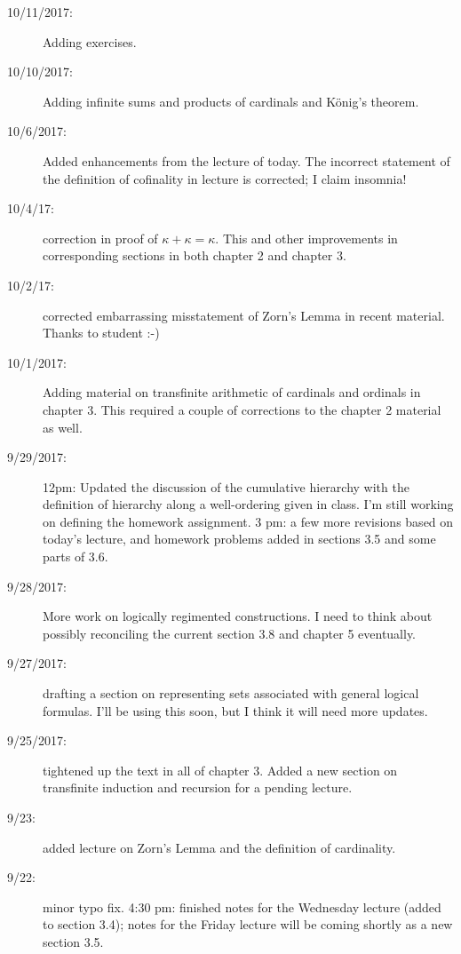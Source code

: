 \documentclass[12pt]{book}
\begin{document}
{\begin{description}
\item[10/11/2017:]  Adding exercises.

\item[10/10/2017:]  Adding infinite sums and products of cardinals and K\"onig's theorem.

\item[10/6/2017:]  Added enhancements from the lecture of today.  The incorrect statement of the definition of cofinality in lecture is corrected; I claim insomnia!

\item[10/4/17:]  correction in proof of $\kappa+\kappa=\kappa$.  This and other improvements in corresponding sections in both chapter 2 and chapter 3.

\item[10/2/17:]  corrected embarrassing misstatement of Zorn's Lemma in recent material.  Thanks to student :-)

\item[10/1/2017:]  Adding material on transfinite arithmetic of cardinals and ordinals in chapter 3.  This required a couple of corrections to the chapter 2 material as well.

\item[9/29/2017:]  12pm:  Updated the discussion of the cumulative hierarchy with the definition of hierarchy along a well-ordering given in class.  I'm still working on defining the homework assignment.  3 pm:  a few more revisions based on today's lecture, and homework problems added in sections 3.5 and some parts of 3.6.

\item[9/28/2017:]  More work on logically regimented constructions.  I need to think about possibly reconciling the current section 3.8 and chapter 5 eventually.

\item[9/27/2017:]  drafting a section on representing sets associated with general logical formulas.  I'll be using this soon, but I think it will need more updates.

\item[9/25/2017:]  tightened up the text in all of chapter 3.  Added a new section on transfinite induction and recursion for a pending lecture.

\item[9/23:]  added lecture on Zorn's Lemma and the definition of cardinality.

\item[9/22:]  minor typo fix.  4:30 pm:  finished notes for the Wednesday lecture (added to section 3.4); notes for the Friday lecture will be coming shortly as a new section 3.5.


\end{description}}
\end{document}
